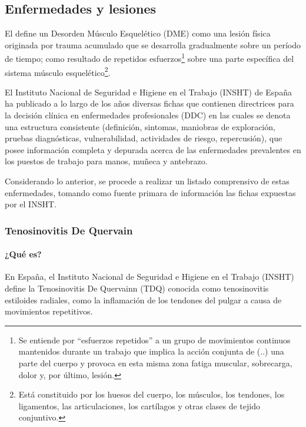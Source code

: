 
\subsection{Enfermedades y lesiones}
El \parencite{MinisteriodeProteccionSocialdeColombia2006GuiaSuperiores} define un Desorden Músculo Esquelético (DME) como una lesión física originada por trauma acumulado que se desarrolla gradualmente sobre un período de tiempo; como resultado de repetidos esfuerzos\footnote{Se entiende por “esfuerzos repetidos” a un grupo de movimientos continuos mantenidos durante un trabajo que implica la acción conjunta de (..) una parte del cuerpo y provoca en esta misma zona fatiga muscular, sobrecarga, dolor y, por último, lesión.\parencite{INSHT2016PrevencionRepetidos}} sobre una parte específica del sistema músculo esquelético\footnote{Está constituido por los huesos del cuerpo, los músculos, los tendones, los ligamentos, las articulaciones, los cartílagos y otras clases de tejido conjuntivo.}. 

El Instituto Nacional de Seguridad e Higiene en el Trabajo (INSHT) de España ha publicado a lo largo de los años diversas fichas que contienen directrices para la decisión clínica en enfermedades profesionales (DDC) en las cuales se denota una estructura consistente (definición, sintomas, maniobras de exploración, pruebas diagnósticas, vulnerabilidad, actividades de riesgo, repercusión), que posee información completa y depurada acerca de las enfermedades prevalentes en los puestos de trabajo para manos, muñeca y antebrazo.

Considerando lo anterior, se procede a realizar un listado comprensivo de estas enfermedades, tomando como fuente primara de información las fichas expuestas por el INSHT.

\subsubsection{Tenosinovitis De Quervain}
\paragraph{¿Qué es?}
En España, el Instituto Nacional de Seguridad e Higiene en el Trabajo (INSHT) define la Tenosinovitis De Quervainn (TDQ) conocida como tenosinovitis estiloides radiales, como la inflamación de los tendones del pulgar a causa de movimientos repetitivos. \parencite[1]{INSHT2017TendinitisPulgar}

